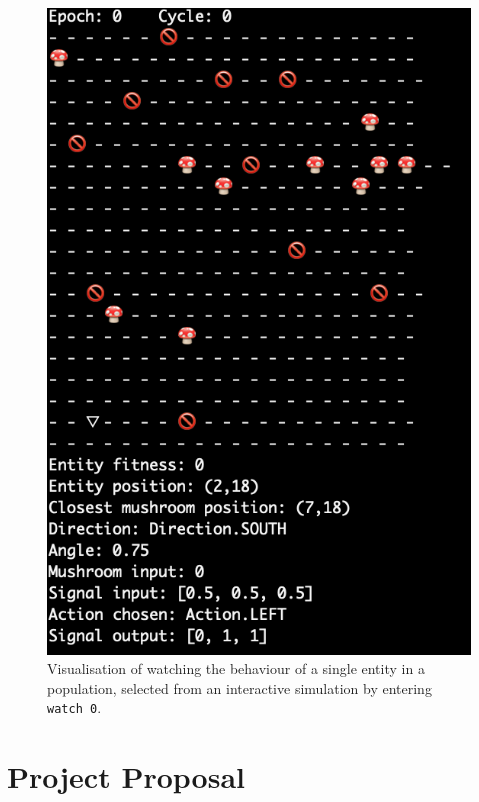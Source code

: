 \documentclass[12pt,a4paper,twoside,openright]{report}
\begin{document}
\begin{figure}[ht]
  \centering
  \includegraphics[width=.9\linewidth]{figs/interactivesingle}
  \caption{Visualisation of watching the behaviour of a single entity in a population, selected from an interactive simulation by entering \texttt{watch 0}.}
  \label{fig:interactivesingle}
\end{figure}


\chapter{Project Proposal}


\end{document}
